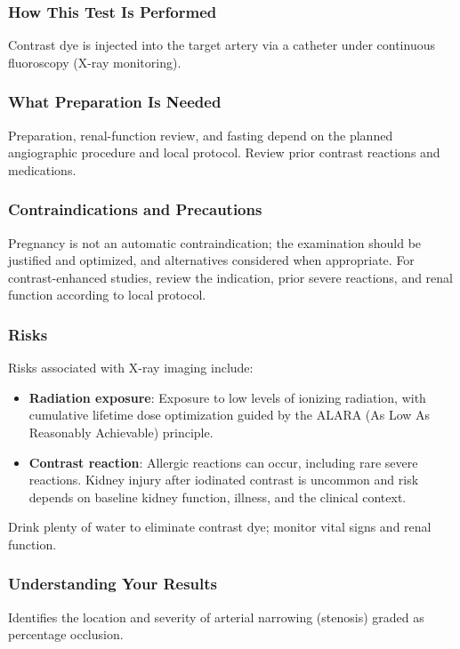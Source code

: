 \subsubsection*{How This Test Is Performed}
Contrast dye is injected into the target artery via a catheter under continuous fluoroscopy (X-ray monitoring).

\subsubsection*{What Preparation Is Needed}
Preparation, renal-function review, and fasting depend on the planned angiographic procedure and local protocol. Review prior contrast reactions and medications.

\subsubsection*{Contraindications and Precautions}
Pregnancy is not an automatic contraindication; the examination should be justified and optimized, and alternatives considered when appropriate. For contrast-enhanced studies, review the indication, prior severe reactions, and renal function according to local protocol.

\subsubsection*{Risks}
Risks associated with X-ray imaging include:
\begin{itemize}
    \item \textbf{Radiation exposure}: Exposure to low levels of ionizing radiation, with cumulative lifetime dose optimization guided by the ALARA (As Low As Reasonably Achievable) principle.
    \item \textbf{Contrast reaction}: Allergic reactions can occur, including rare severe reactions. Kidney injury after iodinated contrast is uncommon and risk depends on baseline kidney function, illness, and the clinical context.
\end{itemize}


Drink plenty of water to eliminate contrast dye; monitor vital signs and renal function.

\subsubsection*{Understanding Your Results}
Identifies the location and severity of arterial narrowing (stenosis) graded as percentage occlusion.

